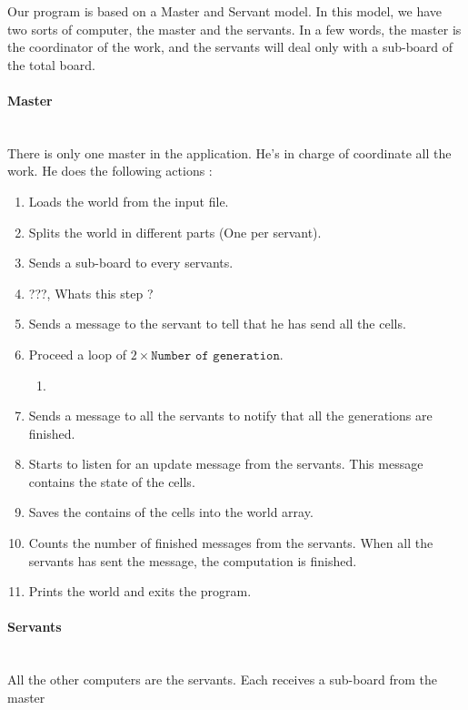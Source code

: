\documentclass[a4paper,10pt]{article}
\begin{document}
Our program is based on a Master and Servant model.
In this model, we have two sorts of computer, the master and the servants.
In a few words, the master is the coordinator of the work, and the servants will deal only with a sub-board of the total board.


\paragraph{Master}
~\\

There is only one master in the application. He's in charge of coordinate all the work. He does the following actions :

\begin{enumerate}
 \item Loads the world from the input file.
 \item Splits the world in different parts (One per servant).
 \item Sends a sub-board to every servants.
 \item ???, Whats this step ?
 \item Sends a message to the servant to tell that he has send all the cells.
 \item Proceed a loop of $2 \times \texttt{Number of generation}$.
 \begin{enumerate}
  \item 
 \end{enumerate}

 \item Sends a message to all the servants to notify that all the generations are finished.
 \item Starts to listen for an update message from the servants. This message contains the state of the cells.
 \item Saves the contains of the cells into the world array.
 \item Counts the number of finished messages from the servants. When all the servants has sent the message, the computation is finished.
 \item Prints the world and exits the program.
\end{enumerate}


\paragraph{Servants}
~\\

All the other computers are the servants. Each receives a sub-board from the master
\end{document}
